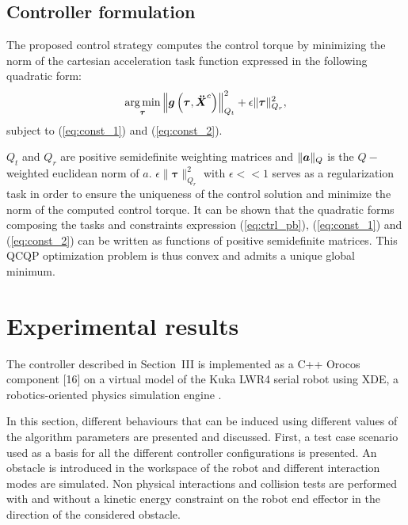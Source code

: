 \documentclass[a4paper, 10pt, conference]{ieeeconf}      %
\newcommand{\vect}[1]{\mbox{\boldmath${#1}$}}%
\DeclareMathOperator*{\argmin}{arg\,min}
\begin{document}
\subsection{Controller formulation}
The proposed control strategy computes the control torque by minimizing the norm of the  cartesian acceleration task function expressed in the following quadratic form: 
\begin{equation}
\argmin \limits_{\boldsymbol{\tau}}  \left\| \vect{g}\left(\boldsymbol{\tau},\vect{\ddot{X}}^c\right) \right\|_{Q_t}^2 + \epsilon  \| \boldsymbol{\tau} \|_{Q_r}^2,
\label{eq:ctrl_pb}
\end{equation}
subject to (\ref{eq:const_1}) and (\ref{eq:const_2}).

$Q_t$ and $Q_r$ are  positive semidefinite weighting matrices and $\| \vect{a} \|_{Q}$ is the $Q-$weighted euclidean norm of $a$. $\epsilon  \| \boldsymbol{\tau} \|_{Q_r}^2$ with $\epsilon << 1$ serves as a regularization task in order to ensure the uniqueness of the control solution and minimize the norm of the computed control torque. It can be shown that the quadratic forms composing the tasks and constraints expression (\ref{eq:ctrl_pb}), (\ref{eq:const_1}) and (\ref{eq:const_2}) can be written as functions of positive semidefinite matrices. This QCQP optimization problem is thus convex and admits a unique global minimum.


\section{Experimental results}
The controller described in Section~III is implemented as a C++ Orocos component [16] on a virtual model of the Kuka LWR4 serial robot using XDE, a robotics-oriented physics simulation engine \cite{merlhiot2012}.

In this section, different behaviours that can be induced using different values of the algorithm parameters are presented and discussed. First, a test case scenario used as a basis for all the different controller configurations is presented. An obstacle is introduced in the workspace of the robot and different interaction modes are simulated. Non physical interactions and collision tests are performed with and without a kinetic energy constraint on the robot end effector in the direction of the considered obstacle. 
\end{document}
